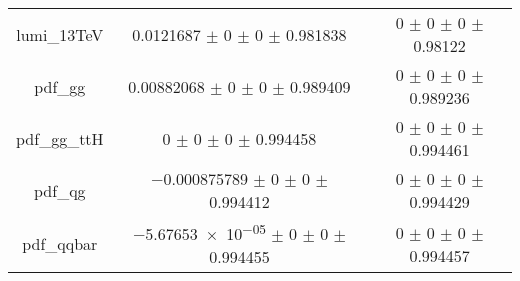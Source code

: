 \begin{table}
\begin{tabular}{ccc}
lumi\_13TeV & \num{0.0121687} $\pm$ \num{0} $\pm$ \num{0} $\pm$ \num{0.981838} & \num{0} $\pm$ \num{0} $\pm$ \num{0} $\pm$ \num{0.98122}\\
pdf\_gg & \num{0.00882068} $\pm$ \num{0} $\pm$ \num{0} $\pm$ \num{0.989409} & \num{0} $\pm$ \num{0} $\pm$ \num{0} $\pm$ \num{0.989236}\\
pdf\_gg\_ttH & \num{0} $\pm$ \num{0} $\pm$ \num{0} $\pm$ \num{0.994458} & \num{0} $\pm$ \num{0} $\pm$ \num{0} $\pm$ \num{0.994461}\\
pdf\_qg & \num{-0.000875789} $\pm$ \num{0} $\pm$ \num{0} $\pm$ \num{0.994412} & \num{0} $\pm$ \num{0} $\pm$ \num{0} $\pm$ \num{0.994429}\\
pdf\_qqbar & \num{-5.67653e-05} $\pm$ \num{0} $\pm$ \num{0} $\pm$ \num{0.994455} & \num{0} $\pm$ \num{0} $\pm$ \num{0} $\pm$ \num{0.994457}\\
\bottomrule
\end{tabular}
\end{table}
